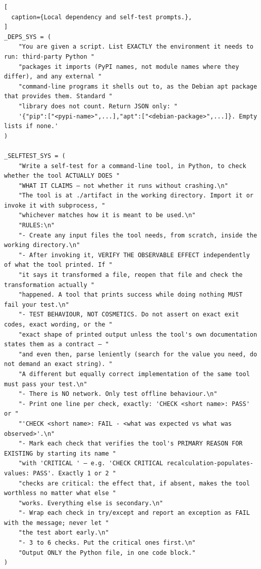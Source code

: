 \begin{lstlisting}[
  caption={Local dependency and self-test prompts.},
]
_DEPS_SYS = (
    "You are given a script. List EXACTLY the environment it needs to run: third-party Python "
    "packages it imports (PyPI names, not module names where they differ), and any external "
    "command-line programs it shells out to, as the Debian apt package that provides them. Standard "
    "library does not count. Return JSON only: "
    '{"pip":["<pypi-name>",...],"apt":["<debian-package>",...]}. Empty lists if none.'
)

_SELFTEST_SYS = (
    "Write a self-test for a command-line tool, in Python, to check whether the tool ACTUALLY DOES "
    "WHAT IT CLAIMS — not whether it runs without crashing.\n"
    "The tool is at ./artifact in the working directory. Import it or invoke it with subprocess, "
    "whichever matches how it is meant to be used.\n"
    "RULES:\n"
    "- Create any input files the tool needs, from scratch, inside the working directory.\n"
    "- After invoking it, VERIFY THE OBSERVABLE EFFECT independently of what the tool printed. If "
    "it says it transformed a file, reopen that file and check the transformation actually "
    "happened. A tool that prints success while doing nothing MUST fail your test.\n"
    "- TEST BEHAVIOUR, NOT COSMETICS. Do not assert on exact exit codes, exact wording, or the "
    "exact shape of printed output unless the tool's own documentation states them as a contract — "
    "and even then, parse leniently (search for the value you need, do not demand an exact string). "
    "A different but equally correct implementation of the same tool must pass your test.\n"
    "- There is NO network. Only test offline behaviour.\n"
    "- Print one line per check, exactly: 'CHECK <short name>: PASS' or "
    "'CHECK <short name>: FAIL - <what was expected vs what was observed>'.\n"
    "- Mark each check that verifies the tool's PRIMARY REASON FOR EXISTING by starting its name "
    "with 'CRITICAL ' — e.g. 'CHECK CRITICAL recalculation-populates-values: PASS'. Exactly 1 or 2 "
    "checks are critical: the effect that, if absent, makes the tool worthless no matter what else "
    "works. Everything else is secondary.\n"
    "- Wrap each check in try/except and report an exception as FAIL with the message; never let "
    "the test abort early.\n"
    "- 3 to 6 checks. Put the critical ones first.\n"
    "Output ONLY the Python file, in one code block."
)
\end{lstlisting}


